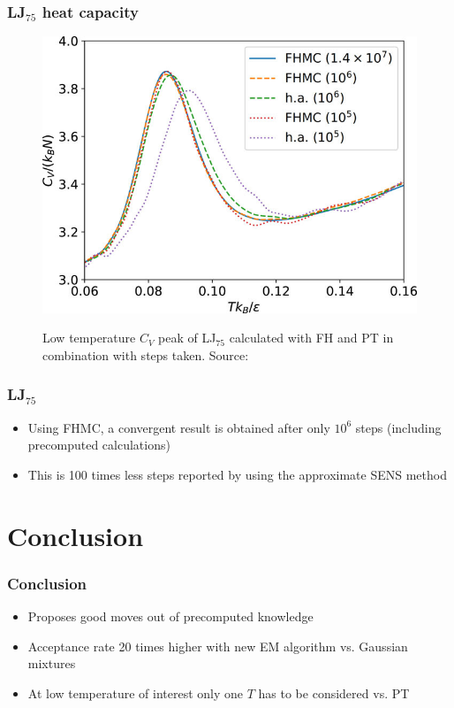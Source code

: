 \documentclass{beamer}
\begin{document}
 	\begin{frame}
 		\frametitle{LJ$_{75}$ heat capacity} %
 		\begin{figure}
			\center
			\includegraphics[height=0.85\textheight]{figures/LJ75_Cv_low.jpg}
			\label{fig:LJ75_Cv_low}
			\caption{Low temperature $C_V$ peak of LJ$_{75}$ calculated with FH and PT in combination with steps taken. Source: \cite{Finkler2020}}
		\end{figure}
 	\end{frame}

 	\begin{frame}
 		\frametitle{LJ$_{75}$}
 		\begin{itemize}
 			\item Using FHMC, a convergent result is obtained after only $10^6$ steps (including precomputed calculations)
 			\item This is 100 times less steps reported by \citeauthor{Martiniani2014} \cite{Martiniani2014} using the approximate SENS method
		\end{itemize}
	\end{frame}

	\section{Conclusion}

	\begin{frame}
		\frametitle{Conclusion}
		\begin{itemize}
			\item Proposes good moves out of precomputed knowledge
			\item Acceptance rate 20 times higher with new EM algorithm vs. Gaussian mixtures
			\item At low temperature of interest only one $T$ has to be considered vs. PT
		\end{itemize}
	\end{frame}
\end{document}
